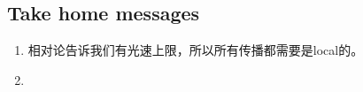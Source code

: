 \subsection{Take home messages}

\begin{enumerate}
  \item 相对论告诉我们有光速上限，所以所有传播都需要是local的。
  \item 
\end{enumerate}





